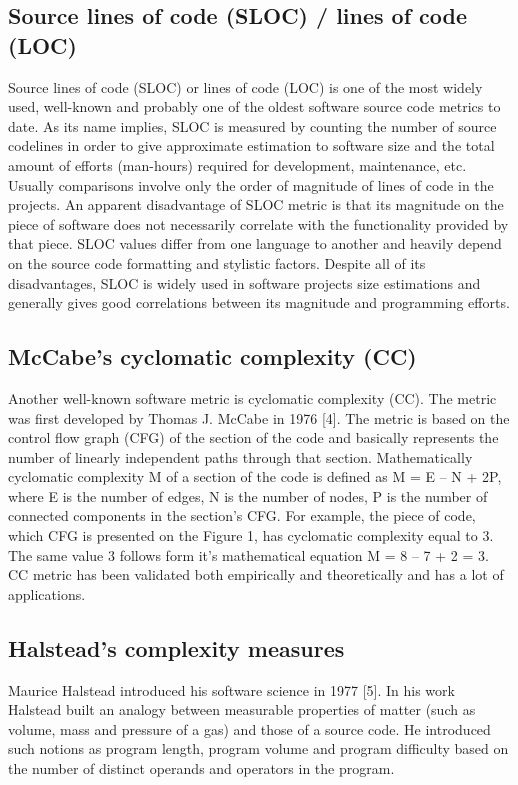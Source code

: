 \subsection{Source lines of code (SLOC) / lines of code (LOC)}
\qquad Source lines of code (SLOC) or lines of code (LOC) is one of the most widely used, well-known and probably one of the oldest software source code metrics to date. As its name implies, SLOC is measured by counting the number of source codelines in order to give approximate estimation to software size and the total amount of efforts (man-hours) required for development, maintenance, etc. Usually comparisons involve only the order of magnitude of lines of code in the projects. An apparent disadvantage of SLOC metric is that its magnitude on the piece of software does not necessarily correlate with the functionality provided by that piece. SLOC values differ from one language to another and heavily depend on the source code formatting and stylistic factors. Despite all of its disadvantages, SLOC is widely used in software projects size estimations and generally gives good correlations between its magnitude and programming efforts.

\subsection{McCabe's cyclomatic complexity (CC)} \cite{cyclomatic-complexity}
\qquad Another well-known software metric is cyclomatic complexity (CC). The metric was first developed by Thomas J. McCabe in 1976 [4]. The metric is based on the control flow graph (CFG) of the section of the code and basically represents the number of linearly independent paths through that section. Mathematically cyclomatic complexity M of a section of the code is defined as M = E – N + 2P, where E is the number of edges, N is the number of nodes, P is the number of connected components in the section's CFG. For example, the piece of code, which CFG is presented on the Figure 1, has cyclomatic complexity equal to 3. The same value 3 follows form it's mathematical equation M = 8 – 7 + 2 = 3. CC metric has been validated both empirically and theoretically and has a lot of applications.

\subsection{Halstead's complexity measures}
\qquad Maurice Halstead introduced his software science in 1977 [5]. In his work
Halstead built an analogy between measurable properties of matter (such as volume, mass and pressure of a gas) and those of a source code. He introduced such notions as program length, program volume and program difficulty based on the number of distinct operands and operators in the program.

